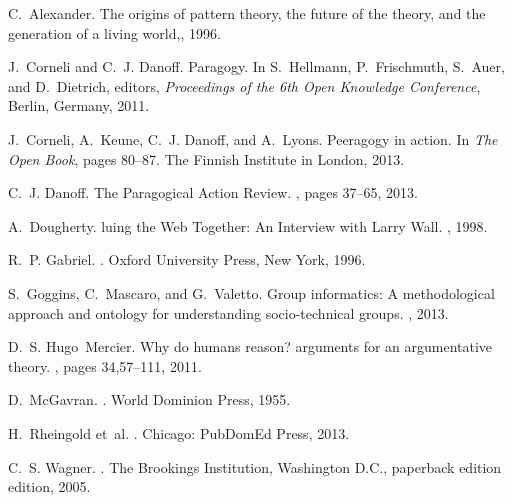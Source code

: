 \documentclass{acm_proc_article-sp}
\begin{document}
\begin{thebibliography}{10}

C.~Alexander.
\newblock The origins of pattern theory, the future of the theory, and the
  generation of a living world,, 1996.

J.~Corneli and C.~J. Danoff.
\newblock Paragogy.
\newblock In S.~Hellmann, P.~Frischmuth, S.~Auer, and D.~Dietrich, editors,
  {\em Proceedings of the 6th Open Knowledge Conference}, Berlin, Germany,
  2011.

J.~Corneli, A.~Keune, C.~J. Danoff, and A.~Lyons.
\newblock Peeragogy in action.
\newblock In {\em The Open Book}, pages 80--87. The Finnish Institute in
  London, 2013.

C.~J. Danoff.
\newblock The {P}aragogical {A}ction {R}eview.
, pages
  37--65, 2013.

A.~Dougherty.
luing the {W}eb {T}ogether: {A}n {I}nterview with {L}arry {W}all.
, 1998.

R.~P. Gabriel.
.
\newblock Oxford University Press, New York, 1996.

S.~Goggins, C.~Mascaro, and G.~Valetto.
\newblock Group informatics: A methodological approach and ontology for
  understanding socio-technical groups.
, 2013.

D.~S. Hugo~Mercier.
\newblock Why do humans reason? arguments for an argumentative theory.
, pages 34,57--111, 2011.

D.~McGavran.
.
\newblock World Dominion Press, 1955.

H.~Rheingold et~al.
.
\newblock Chicago: PubDomEd Press, 2013.

C.~S. Wagner.
.
\newblock The Brookings Institution, Washington D.C., paperback edition
  edition, 2005.

\end{thebibliography}

\balancecolumns
\end{document}
